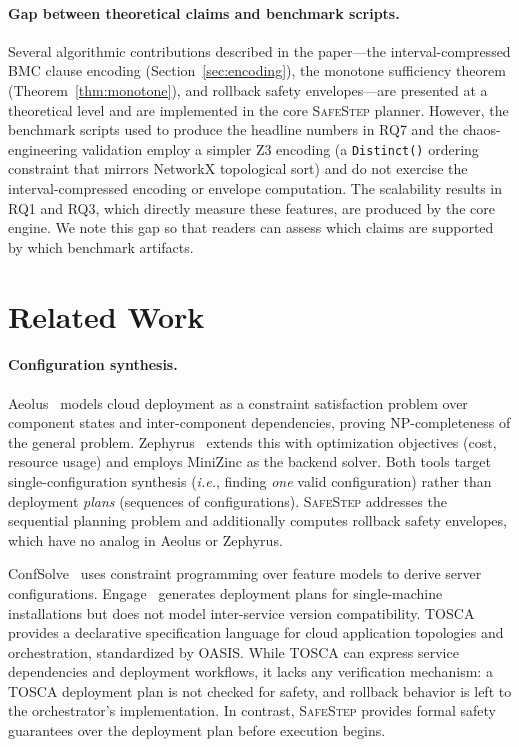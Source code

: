\documentclass[10pt,twocolumn]{article}
\newcommand{\safestep}{\textsc{SafeStep}}
\newcommand{\ie}{\textit{i.e.}}
\begin{document}
\paragraph{Gap between theoretical claims and benchmark scripts.}
Several algorithmic contributions described in the paper---the
interval-compressed BMC clause encoding
(Section~\ref{sec:encoding}), the monotone sufficiency theorem
(Theorem~\ref{thm:monotone}), and rollback safety
envelopes---are presented at a theoretical level and are
implemented in the core \safestep{} planner.  However, the
benchmark scripts used to produce the headline numbers in RQ7
and the chaos-engineering validation employ a simpler Z3
encoding (a \texttt{Distinct()} ordering constraint that
mirrors NetworkX topological sort) and do not exercise the
interval-compressed encoding or envelope computation.  The
scalability results in RQ1 and RQ3, which directly measure
these features, are produced by the core engine.  We note this
gap so that readers can assess which claims are supported by
which benchmark artifacts.

\section{Related Work}
\label{sec:related}

\paragraph{Configuration synthesis.}
Aeolus~\cite{dicosmo-aeolus-2014} models cloud deployment as
a constraint satisfaction problem over component states and
inter-component dependencies, proving NP-completeness of the
general problem. Zephyrus~\cite{becker-zephyrus-2015} extends
this with optimization objectives (cost, resource usage) and
employs MiniZinc as the backend solver. Both tools target
single-configuration synthesis (\ie, finding \emph{one} valid
configuration) rather than deployment \emph{plans} (sequences
of configurations). \safestep{} addresses the sequential
planning problem and additionally computes rollback safety
envelopes, which have no analog in Aeolus or Zephyrus.

ConfSolve~\cite{hewson-confsolve-2012} uses constraint
programming over feature models to derive server
configurations. Engage~\cite{fischer-engage-2012} generates
deployment plans for single-machine installations but does not
model inter-service version compatibility. TOSCA~\cite{tosca-2013}
provides a declarative specification language for cloud
application topologies and orchestration, standardized by OASIS.
While TOSCA can express service dependencies and deployment
workflows, it lacks any verification mechanism: a TOSCA
deployment plan is not checked for safety, and rollback
behavior is left to the orchestrator's implementation. In
contrast, \safestep{} provides formal safety guarantees over
the deployment plan before execution begins.
\end{document}
